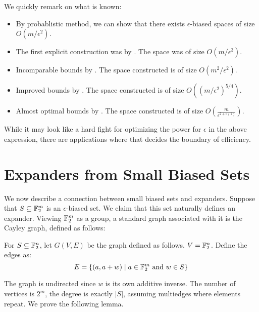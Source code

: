\noindent We quickly remark on what is known:

\begin{itemize}
\item By probablistic method, we can show that there exists $\epsilon$-biased spaces of size $O(m/\epsilon^2)$.
\item The first explicit construction was by \cite{NN90,NN93}. The space was of size $O(m/\epsilon^3)$.
\item Incomparable bounds by \cite{AGHP92}. The space constructed is of size $O(m^2/\epsilon^2)$.
\item Improved bounds by \cite{BT09}. The space constructed is of size $O\left((m/\epsilon^2)^{5/4}\right)$.
\item Almost optimal bounds by \cite{Tas17}. The space constructed is of size $O\left(\frac{m}{\epsilon^{2+o(1)}} \right)$.
\end{itemize}

While it may look like a hard fight for optimizing the power for $\epsilon$ in the above expression, there are applications where that decides the boundary of efficiency.

\section{Expanders from Small Biased Sets}
\label{sec:expanders-from-small-biased-sets}
We now describe a connection between small biased sets and expanders. Suppose that $S \subseteq {\mathbb{F}}_2^m$ is an $\epsilon$-biased set. We claim that this set naturally defines an expander. Viewing ${\mathbb{F}}_2^m$ as a group, a standard graph associated with it is the Cayley graph, defined as follows:

\begin{definition}
For $S \subseteq {\mathbb{F}}_2^n$, let $G(V,E)$ be the graph defined as follows. $V = {\mathbb{F}}_2^n$. Define the edges as:
$$E = \left\{ (a,a+w) \mid a \in {\mathbb{F}}_2^m \textrm{ and } w \in S\right\}$$
\end{definition}

The graph is undirected since $w$ is its own additive inverse. The number of vertices is $2^m$, the degree is exactly $|S|$, assuming multiedges where elements repeat. We prove the following lemma.

